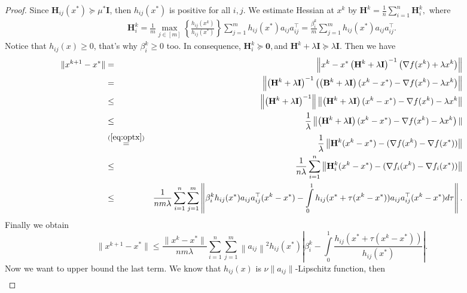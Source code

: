 \documentclass[12pt]{article}
\newcommand{\newalpha}{h}
\newcommand{\mH}{\mathbf{H}}
\newcommand{\mI}{\mathbf{I}}
\begin{document}
\begin{proof}
	Since $\mH_{ij}(x^*) \succeq \mu^*\mI$, then $\newalpha_{ij}(x^*)$ is positive for all $i,j$. We estimate Hessian at $x^k$ by $\mH^k = \frac{1}{n}\sum\limits_{i=1}^n\mH_i^k,$ where 
	\begin{eqnarray*}
		\mH_i^k = \frac{1}{m}\max_{j \in [m]}\left\{\frac{\newalpha_{ij}(x^k)}{\newalpha_{ij}(x^*)}\right\}\sum\limits_{j=1}^m\newalpha_{ij}(x^*)a_{ij}a_{ij}^\top = \frac{\beta^k_i}{m}\sum\limits_{j=1}^m\newalpha_{ij}(x^*)a_{ij}a_{ij}^\top. 
	\end{eqnarray*}
	Notice that $h_{ij}(x) \geq 0$, that's why $\beta_i^k \geq 0$ too. In consequence, $\mH_i^k \succeq \mathbf{0}, $and $\mH^k+\lambda\mI  \succeq \lambda\mI$. Then we have
	\begin{eqnarray*}
		\|x^{k+1}-x^*\| & = & \left\|x^k-x^*\left(\mH^k+\lambda\mI\right)^{-1}\left(\nabla f(x^k) + \lambda x^k\right)\right\|\\
		&=&\left\|\left(\mH^k+\lambda\mI\right)^{-1}\left(\left(\mathbf{B}^k+\lambda\mathbf{I}\right)(x^k-x^*)-\nabla f(x^k) - \lambda x^k\right)\right\|\\
		&\leq & \left\|\left(\mH^k+\lambda\mI\right)^{-1}\right\|\left\|\left(\mH^k+\lambda\mI\right)(x^k-x^*)-\nabla f(x^k) - \lambda x^k\right\|\\
		&\leq & \frac{1}{\lambda}\left\|\left(\mH^k+\lambda\mI\right)(x^k-x^*)-\nabla f(x^k) - \lambda x^k\right)\|\\
		&\overset{(\ref{eq:optx})}{=}& \frac{1}{\lambda}\left\|\mH^k(x^k-x^*) - (\nabla f(x^k) -\nabla f(x^*))\right\| \\
		&\leq&\frac{1}{n\lambda}\sum\limits_{i=1}^n\left\|\mH_i^k(x^k-x^*) -(\nabla f_i(x^k) - \nabla f_i(x^*))\right\|\\
		&\leq&\frac{1}{nm\lambda}\sum\limits_{i=1}^n\sum\limits_{j=1}^m\left\|\beta_i^k\newalpha_{ij}(x^*)a_{ij}a_{ij}^\top(x^k-x^*) - \int\limits_0^1\newalpha_{ij}(x^*+\tau(x^k-x^*))a_{ij}a_{ij}^\top(x^k-x^*) d\tau\right\|.
	\end{eqnarray*}
	Finally we obtain
	\begin{equation}
		\label{originalmaxnewton1}
		\|x^{k+1}-x^*\| \leq  \frac{\|x^k-x^*\|}{nm\lambda}\sum\limits_{i=1}^n\sum\limits_{j=1}^m\left\|a_{ij}\right\|^2\newalpha_{ij}(x^*)\left|\beta_i^k-\int\limits_0^1\frac{\newalpha_{ij}(x^*+\tau(x^k-x^*))}{\newalpha_{ij}(x^*)}\right|.
	\end{equation}
	Now we want to upper bound the last term. We know that $\newalpha_{ij}(x)$ is $\nu\|a_{ij}\|$-Lipschitz function, then \begin{eqnarray*}

\end{eqnarray*}
\end{proof}
\end{document}
